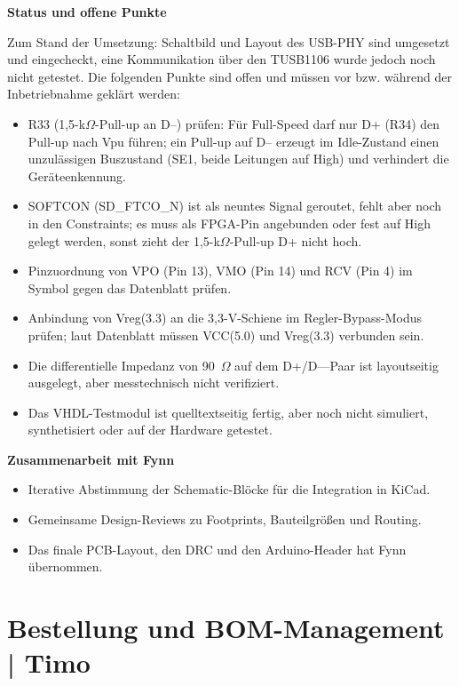 \documentclass[a4paper,11pt]{article}
\begin{document}
\textbf{Status und offene Punkte}

Zum Stand der Umsetzung: Schaltbild und Layout des USB-PHY sind umgesetzt und eingecheckt, eine Kommunikation über den TUSB1106 wurde jedoch noch nicht getestet. Die folgenden Punkte sind offen und müssen vor bzw. während der Inbetriebnahme geklärt werden:
\begin{itemize}
	\item R33 (1,5-k$\Omega$-Pull-up an D--) prüfen: Für Full-Speed darf nur D+ (R34) den Pull-up nach Vpu führen; ein Pull-up auf D-- erzeugt im Idle-Zustand einen unzulässigen Buszustand (SE1, beide Leitungen auf High) und verhindert die Geräteenkennung.
	\item SOFTCON (SD\_FTCO\_N) ist als neuntes Signal geroutet, fehlt aber noch in den Constraints; es muss als FPGA-Pin angebunden oder fest auf High gelegt werden, sonst zieht der 1,5-k$\Omega$-Pull-up D+ nicht hoch.
	\item Pinzuordnung von VPO (Pin 13), VMO (Pin 14) und RCV (Pin 4) im Symbol gegen das Datenblatt prüfen.
	\item Anbindung von Vreg(3.3) an die 3,3-V-Schiene im Regler-Bypass-Modus prüfen; laut Datenblatt müssen VCC(5.0) und Vreg(3.3) verbunden sein.
	\item Die differentielle Impedanz von 90~$\Omega$ auf dem D+/D---Paar ist layoutseitig ausgelegt, aber messtechnisch nicht verifiziert.
	\item Das VHDL-Testmodul ist quelltextseitig fertig, aber noch nicht simuliert, synthetisiert oder auf der Hardware getestet.
\end{itemize}

\textbf{Zusammenarbeit mit Fynn}
\begin{itemize}
	\item Iterative Abstimmung der Schematic-Blöcke für die Integration in KiCad.
	\item Gemeinsame Design-Reviews zu Footprints, Bauteilgrößen und Routing.
	\item Das finale PCB-Layout, den DRC und den Arduino-Header hat Fynn übernommen.
\end{itemize}
\newpage
\section{Bestellung und BOM-Management | Timo}
\end{document}
